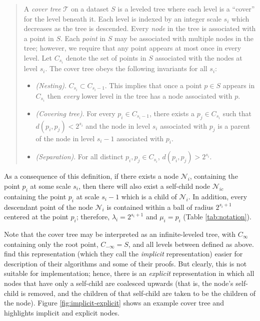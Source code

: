 \begin{quote}
A {\it cover tree} $\mathscr{T}$ on a dataset $S$ is a leveled tree where each
level is a ``cover'' for the level beneath it.  Each level is indexed by an
integer scale $s_i$ which decreases as the tree is descended.  Every {\it node}
in the tree is associated with a point in $S$.  Each {\it point} in $S$ may be
associated with multiple nodes in the tree; however, we require that any point
appears at most once in every level.  Let $C_{s_i}$ denote the set of points in
$S$ associated with the nodes at level $s_i$.  The cover tree obeys the
following invariants for all $s_i$:

\begin{itemize}
  \item {\em (Nesting)}. $C_{s_i} \subset C_{s_i - 1}$.  This implies that once a
point $p \in S$ appears in $C_{s_i}$ then {\it every} lower level in the tree
has a node associated with $p$.

  \item {\em (Covering tree)}. For every $p_i \in C_{s_i - 1}$, there exists a
$p_j \in C_{s_i}$ such that $d(p_i, p_j) < 2^{s_i}$ and the node in level $s_i$
associated with $p_j$ is a parent of the node in level $s_i - 1$ associated with
$p_i$.

  \item {\em (Separation)}.  For all distinct $p_i, p_j \in C_{s_i}$, $d(p_i,
p_j) > 2^{s_i}$.
\end{itemize}
\end{quote}

As a consequence of this definition, if there exists a node $\mathscr{N}_i$,
containing the point $p_i$ at some scale $s_i$, then there will also exist a
self-child node $\mathscr{N}_{ic}$ containing the point $p_i$ at scale $s_i - 1$
which is a child of $\mathscr{N}_i$.  In addition, every descendant point of the
node $\mathscr{N}_i$ is contained within a ball of radius $2^{s_i + 1}$ centered
at the point $p_i$; therefore, $\lambda_i = 2^{s_i + 1}$ and $\mu_i = p_i$
(Table \ref{tab:notation}).

Note that the cover tree may be interpreted as an infinite-leveled tree, with
$C_{\infty}$ containing only the root point, $C_{-\infty} = S$, and all levels
between defined as above.  \citet{langford2006} find
this representation (which they call the {\it implicit} representation) easier
for description of their algorithms and some of their proofs.  But clearly,
this is not suitable for implementation; hence, there is an {\it explicit}
representation in which all nodes that have only a self-child are coalesced
upwards (that is, the node's self-child is removed, and the children of that
self-child are taken to be the children of the node).  Figure
\ref{fig:implicit-explicit} shows an example cover tree and highlights implicit
and explicit nodes.

